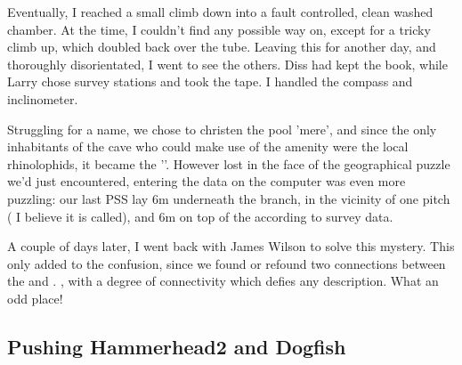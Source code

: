 	Eventually, I reached a small climb down into a fault controlled, clean washed chamber. At the time, I couldn't find any possible way on, except for a tricky climb up, which doubled back over the tube. Leaving this for another day, and thoroughly disorientated, I went to see the others. Diss had kept the book, while Larry chose survey stations and took the tape. I handled the compass and inclinometer. 
	
	Struggling for a name, we chose to christen the pool 'mere', and since the only inhabitants of the cave who could make use of the amenity were the local rhinolophids, it became the ''. However lost in the face of the geographical puzzle we'd just encountered, entering the data on the computer was even more puzzling: our last PSS lay 6m underneath the  branch, in the vicinity of one pitch ( I believe it is called), and 6m on top of the  according to survey data.
	
	A couple of days later, I went back with James Wilson to solve this mystery. This only added to the confusion, since we found or refound two connections between the  and . , with a degree of connectivity which defies any description. What an odd place!


\subsection{Pushing Hammerhead2 and Dogfish}

\begin{marginfigure}
\end{marginfigure}

